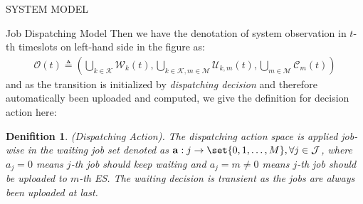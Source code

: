 \documentclass[10pt, conference, letterpaper]{IEEEtran}
\newtheorem{definition}{Denifition}
\newcommand{\eq}{=}
\renewcommand{\vec}{\mathbf}
\DeclarePairedDelimiter\set\{\}
\newcommand{\apSet}{\mathcal{K}}
\newcommand{\esSet}{\mathcal{M}}
\newcommand{\jSet}{\mathcal{J}}
\newcommand{\wSet}{\mathcal{W}}
\newcommand{\uSet}{\mathcal{U}}
\newcommand{\cSet}{\mathcal{C}}
\begin{document}
\begin{section}{SYSTEM MODEL}
\begin{subsection}{Job Dispatching Model}
            Then we have the denotation of system observation in $t$-th timeslots on left-hand side in the figure as:
            \begin{align}
                \mathcal{O}(t) \triangleq (\bigcup\limits_{k\in\apSet}\wSet_{k}(t), \bigcup\limits_{k\in\apSet, m\in\esSet}\uSet_{k,m}(t), \bigcup\limits_{m\in\esSet}\cSet_{m}(t))
            \end{align}
            and as the transition is initialized by \emph{dispatching decision} and therefore automatically been uploaded and computed, we give the definition for decision action here:
            \begin{definition}
                (Dispatching Action).
                The dispatching action space is applied job-wise in the waiting job set denoted as $\vec{a}: j \to \set{0,1,\dots,M}, \forall j\in\jSet$, where $a_j\eq0$ means $j$-th job should keep waiting and $a_j=m\neq0$ means $j$-th job should be uploaded to $m$-th ES. The waiting decision is transient as the jobs are always been uploaded at last.
            \end{definition}


\end{subsection}
\end{section}
\end{document}

